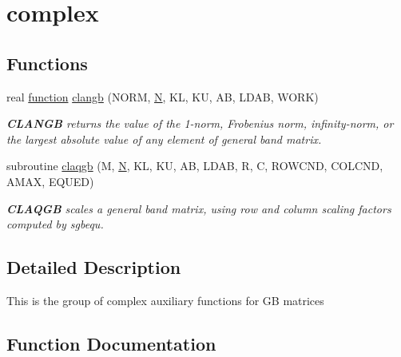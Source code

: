 \hypertarget{group__complexGBauxiliary}{}\section{complex}
\label{group__complexGBauxiliary}
\subsection*{Functions}
\begin{DoxyCompactItemize}
\item 
real \hyperlink{afunc_8m_a7b5e596df91eadea6c537c0825e894a7}{function} \hyperlink{group__complexGBauxiliary_ga8bbfc1becb94399a6c92c37c94972587}{clangb} (N\+O\+R\+M, \hyperlink{polmisc_8c_a0240ac851181b84ac374872dc5434ee4}{N}, K\+L, K\+U, A\+B, L\+D\+A\+B, W\+O\+R\+K)
\begin{DoxyCompactList}\small\item\em {\bfseries C\+L\+A\+N\+G\+B} returns the value of the 1-\/norm, Frobenius norm, infinity-\/norm, or the largest absolute value of any element of general band matrix. \end{DoxyCompactList}\item 
subroutine \hyperlink{group__complexGBauxiliary_gace4fc1b659b18893679cc09dd8b5b998}{claqgb} (M, \hyperlink{polmisc_8c_a0240ac851181b84ac374872dc5434ee4}{N}, K\+L, K\+U, A\+B, L\+D\+A\+B, R, C, R\+O\+W\+C\+N\+D, C\+O\+L\+C\+N\+D, A\+M\+A\+X, E\+Q\+U\+E\+D)
\begin{DoxyCompactList}\small\item\em {\bfseries C\+L\+A\+Q\+G\+B} scales a general band matrix, using row and column scaling factors computed by sgbequ. \end{DoxyCompactList}\end{DoxyCompactItemize}


\subsection{Detailed Description}
This is the group of complex auxiliary functions for G\+B matrices 

\subsection{Function Documentation}
\hypertarget{group__complexGBauxiliary_ga8bbfc1becb94399a6c92c37c94972587}{}
